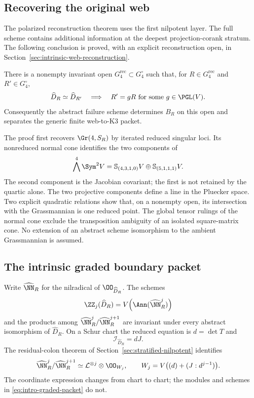 \subsection{Recovering the original web}

The polarized reconstruction theorem uses the first nilpotent layer.
The full scheme contains additional information at the deepest
projection-corank stratum.  The following conclusion is proved, with
an explicit reconstruction open, in
Section~\ref{sec:intrinsic-web-reconstruction}.

\begin{theorem}
\label{thm:main-web-reconstruction}
There is a nonempty invariant open \(G_4^{\mathrm{rec}}\subset
G_4^\circ\) such that, for \(R\in G_4^{\mathrm{rec}}\) and
\(R'\in G_4^\circ\),
\[
 \widehat D_R\simeq\widehat D_{R'}\quad\Longrightarrow\quad
 R'=gR\ \text{for some }g\in\PGL(V).
\]
Consequently the abstract failure scheme determines \(B_R\) on
this open and separates the generic finite web-to-K3 packet.
\end{theorem}

The proof first recovers \(\Gr(4,S_R)\) by iterated reduced
singular loci.  Its nonreduced normal cone identifies the two
components of
\[
 \bigwedge^4\Sym^2V=
 \mathbb S_{(4,3,1,0)}V\oplus\mathbb S_{(5,1,1,1)}V.
\]
The second component is the Jacobian covariant; the first is not
retained by the quartic alone.  The two projective components define a
line in the Pluecker space.  Two explicit quadratic relations show
that, on a nonempty open, its intersection with the Grassmannian is
one reduced point.  The global tensor rulings of the normal cone
exclude the transposition ambiguity of an isolated square-matrix
cone.  No extension of an abstract scheme isomorphism to the ambient
Grassmannian is assumed.

\subsection{The intrinsic graded boundary packet}

Write \(\widehat\NN_R\) for the nilradical of
\(\OO_{\widehat D_R}\).  The schemes
\[
 \ZZ_j(\widehat D_R)=
 V\!\left(\Ann(\widehat\NN_R^{j})\right)
\]
and the products among
\(\widehat\NN_R^j/\widehat\NN_R^{j+1}\) are invariant under
every abstract isomorphism of \(\widehat D_R\).  On a Schur chart
the reduced equation is \(d=\det T\) and
\[
 \mathcal I_{\widehat D_R}=dJ.
\]
The residual-colon theorem of Section~\ref{sec:stratified-nilpotent}
identifies
\begin{equation}\label{eq:intro-graded-packet}
 \widehat\NN_R^j/\widehat\NN_R^{j+1}
 \simeq
 \mathcal L^{\otimes j}\otimes\OO_{W_j},\qquad
 W_j=V\bigl((d)+(J:d^{j-1})\bigr).
\end{equation}
The coordinate expression changes from chart to chart; the modules
and schemes in \eqref{eq:intro-graded-packet} do not.

